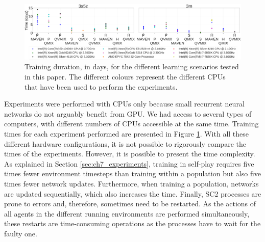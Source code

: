 \begin{figure}[ht]
    \centering
    \includegraphics[width=\textwidth]{tex_thesis/figures/ch7/training_time.pdf}
    \caption{Training duration, in days, for the different learning scenarios tested in this paper.
    The different colours represent the different CPUs that have been used to perform the experiments.}
    \label{fig:training_time}
\end{figure}

Experiments were performed with CPUs only because small recurrent neural networks do not arguably benefit from GPU.
We had access to several types of computers, with different numbers of CPUs accessible at the same time.
Training times for each experiment performed are presented in Figure \ref{fig:training_time}.
With all these different hardware configurations, it is not possible to rigorously compare the times of the experiments.
However, it is possible to present the time complexity.
As explained in Section \ref{sec:ch7_experiments}, training in self-play requires five times fewer environment timesteps than training within a population but also five times fewer network updates.
Furthermore, when training a population, networks are updated sequentially, which also increases the time.
Finally, SC2 processes are prone to errors and, therefore, sometimes need to be restarted.
As the actions of all agents in the different running environments are performed simultaneously, these restarts are time-consuming operations as the processes have to wait for the faulty one.
